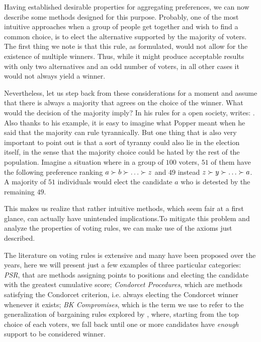 Having established desirable properties for aggregating preferences, we can now describe some methods designed for this purpose.
Probably, one of the most intuitive approaches when a group of people get together and wish to find a common choice, is to elect the alternative supported by the majority of voters. The first thing we note is that this rule, as formulated, would not allow for the existence of multiple winners. Thus, while it might produce acceptable results with only two alternatives and an odd number of voters, in all other cases it would not always yield a winner.

Nevertheless, let us step back from these considerations for a moment and assume that there is always a majority that agrees on the choice of the winner. What would the decision of the majority imply?
In his rules for a open society, \citet[vol. 2, ch. 19]{Popper1945} writes:
\textit{}.
Also thanks to his example, it is easy to imagine what Popper meant when he said that the majority can rule tyrannically.
But one thing that is also very important to point out is that a sort of tyranny could also lie in the election itself, in the sense that the majority choice could be hated by the rest of the population.
Imagine a situation where in a group of $100$ voters, $51$ of them have the following preference ranking $a\pref b \pref \dots \pref z$ and $49$ instead $z \pref y \pref \dots \pref a$. A majority of $51$ individuals would elect the candidate $a$ who is detested by the remaining $49$.

This makes us realize that rather intuitive methods, which seem fair at a first glance, can actually have unintended implications.To mitigate this problem and analyze the properties of voting rules, we can make use of the axioms just described.

The literature on voting rules is extensive and many have been proposed over the years, here we will present just a few examples of three particular categories: \textit{\acl{PSR}}, that are methods assigning points to positions and electing the candidate with the greatest cumulative score; \textit{Condorcet Procedures}, which are methods satisfying the Condorcet criterion, i.e. always electing the Condorcet winner whenever it exists; \textit{BK Compromises}, which is the term we use to refer to the generalization of bargaining rules explored by \citet{Brams2001}, where, starting from the top choice of each voters, we fall back until one or more candidates have \textit{enough} support to be considered winner.

